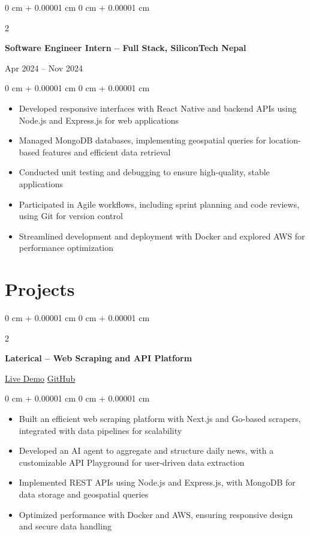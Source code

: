 \documentclass[10pt, letterpaper]{article}
\newenvironment{highlights}{
    \begin{itemize}[
        topsep=0.10 cm,
        parsep=0.10 cm,
        partopsep=0pt,
        itemsep=0pt,
        leftmargin=0 cm + 10pt
    ]
}{
    \end{itemize}
} %
\newenvironment{onecolentry}{
    \begin{adjustwidth}{
        0 cm + 0.00001 cm
    }{
        0 cm + 0.00001 cm
    }
}{
    \end{adjustwidth}
} %
\newenvironment{twocolentry}[2][]{
    \onecolentry
    \def\secondColumn{#2}
    \setcolumnwidth{\fill, 4.5 cm}
    \begin{paracol}{2}
}{
    \switchcolumn \raggedleft \secondColumn
    \end{paracol}
    \endonecolentry
} %
\begin{document}
    \begin{twocolentry}{Apr 2024 -- Nov 2024}
        \textbf{Software Engineer Intern -- Full Stack, SiliconTech Nepal}
    \end{twocolentry}
    \vspace{0.10 cm}
    \begin{onecolentry}
        \begin{highlights}
            \item Developed responsive interfaces with React Native and backend APIs using Node.js and Express.js for web applications
            \item Managed MongoDB databases, implementing geospatial queries for location-based features and efficient data retrieval
            \item Conducted unit testing and debugging to ensure high-quality, stable applications
            \item Participated in Agile workflows, including sprint planning and code reviews, using Git for version control
            \item Streamlined development and deployment with Docker and explored AWS for performance optimization
        \end{highlights}
    \end{onecolentry}

    \section{Projects}
    \begin{twocolentry}{
        \href{https://laterical.com}{Live Demo} \AND \href{https://github.com/Prashidha0O1/laterical}{GitHub}
    }
        \textbf{Laterical -- Web Scraping and API Platform}
    \end{twocolentry}
    \vspace{0.10 cm}
    \begin{onecolentry}
        \begin{highlights}
            \item Built an efficient web scraping platform with Next.js and Go-based scrapers, integrated with data pipelines for scalability
            \item Developed an AI agent to aggregate and structure daily news, with a customizable API Playground for user-driven data extraction
            \item Implemented REST APIs using Node.js and Express.js, with MongoDB for data storage and geospatial queries
            \item Optimized performance with Docker and AWS, ensuring responsive design and secure data handling
        \end{highlights}
    \end{onecolentry}
\end{document}
